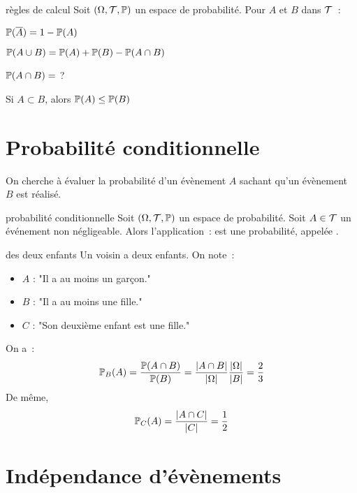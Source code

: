 \begin{proposition}{}{règles de calcul}
    Soit $(\Omega, \mathcal{T}, \mathbb{P})$ un espace de probabilité. Pour $A$ et $B$ dans $\mathcal{T}$~:
    \begin{enumeratebf}
        \item $\mathbb{P}(\overline{A}) = 1 - \mathbb{P}(A)$
        \item $\mathbb{P}(A\cup B) = \mathbb{P}(A) + \mathbb{P}(B) - \mathbb{P}(A \cap B)$
        \item $\mathbb{P}(A \cap B) = $ ?
        \item Si $A \subset B$, alors $\mathbb{P}(A) \leq \mathbb{P}(B)$
    \end{enumeratebf}
\end{proposition}

\section{Probabilité conditionnelle}

On cherche à évaluer la probabilité d'un évènement $A$ sachant qu'un évènement $B$ est réalisé.

\begin{definition}{}{probabilité conditionnelle}
    Soit $(\Omega, \mathcal{T}, \mathbb{P})$ un espace de probabilité. Soit $A \in \mathcal{T}$ un événement non négligeable. Alors l'application~:
    est une probabilité, appelée .
\end{definition}

\begin{exemple}{}{des deux enfants}
    Un voisin a deux enfants. On note~:
    \begin{itemize}
        \item $A$ : "Il a au moins un garçon."
        \item $B$ : "Il a au moins une fille."
        \item $C$ : "Son deuxième enfant est une fille."
    \end{itemize}
    On a~:
    $$\mathbb{P}_B(A) = \frac{\mathbb{P}(A \cap B)}{\mathbb{P}(B)} = \frac{|A \cap B|}{|\Omega|} \frac{|\Omega|}{|B|} = \frac{2}{3}$$
    De même, 
    $$\mathbb{P}_C(A) = \frac{|A \cap C|}{|C|} = \frac{1}{2}$$
\end{exemple}


\section{Indépendance d'évènements}

